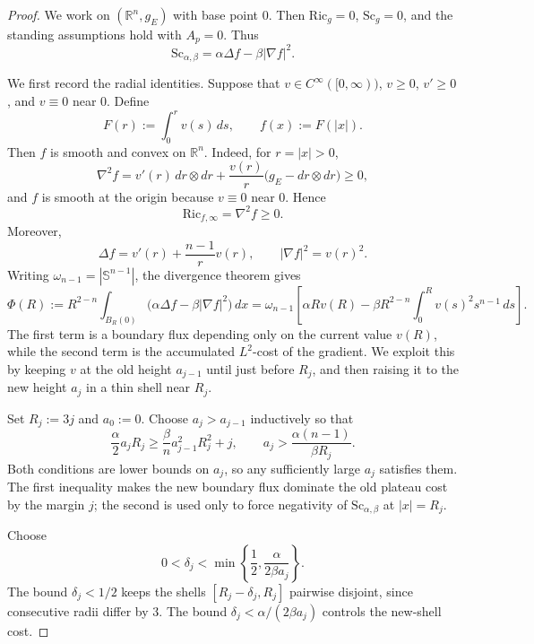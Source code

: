 \documentclass[10pt,a4paper]{amsart}
\begin{document}
\begin{proof}
We work on \((\mathbb R^n,g_{E})\) with base point \(0\). Then
\(\mathrm{Ric}_g=0\), \(\mathrm{Sc}_g=0\), and the standing assumptions hold
with \(A_p=0\). Thus
\[
  \mathrm{Sc}_{\alpha,\beta}
  =
  \alpha\Delta f-\beta|\nabla f|^2 .
\]

We first record the radial identities. Suppose that
\(v\in C^\infty([0,\infty))\), \(v\ge0\), \(v'\ge0\), and \(v\equiv0\) near
\(0\). Define
\[
  F(r):=\int_0^r v(s)\,ds,
  \qquad
  f(x):=F(|x|).
\]
Then \(f\) is smooth and convex on \(\mathbb R^n\). Indeed, for \(r=|x|>0\),
\[
  \nabla^2 f
  =
  v'(r)\,dr\otimes dr
  +
  \frac{v(r)}{r}
  \bigl(g_{E}-dr\otimes dr\bigr)\ge0,
\]
and \(f\) is smooth at the origin because \(v\equiv0\) near \(0\). Hence
\[
  \mathrm{Ric}_{f,\infty}
  =
  \nabla^2 f
  \ge0.
\]
Moreover,
\[
  \Delta f=v'(r)+\frac{n-1}{r}v(r),
  \qquad
  |\nabla f|^2=v(r)^2 .
\]
Writing \(\omega_{n-1}=|\mathbb S^{n-1}|\), the divergence theorem gives
\begin{equation}\label{eq:Phi-short-final}
  \Phi(R):=
  R^{2-n}
  \int_{B_R(0)}
  \bigl(\alpha\Delta f-\beta|\nabla f|^2\bigr)\,dx
  =
  \omega_{n-1}
  \left[
    \alpha Rv(R)
    -
    \beta R^{2-n}\int_0^R v(s)^2s^{n-1}\,ds
  \right].
\end{equation}
The first term is a boundary flux depending only on the current value
\(v(R)\), while the second term is the accumulated \(L^2\)-cost of the
gradient. We exploit this by keeping \(v\) at the old height \(a_{j-1}\) until
just before \(R_j\), and then raising it to the new height \(a_j\) in a thin
shell near \(R_j\).

Set \(R_j:=3j\) and \(a_0:=0\). Choose \(a_j>a_{j-1}\) inductively so that
\begin{equation}\label{eq:aj-final-short}
  \frac{\alpha}{2}a_jR_j
  \ge
  \frac{\beta}{n}a_{j-1}^2R_j^2+j,
  \qquad
  a_j>\frac{\alpha(n-1)}{\beta R_j}.
\end{equation}
Both conditions are lower bounds on \(a_j\), so any sufficiently large \(a_j\)
satisfies them. The first inequality makes the new boundary flux dominate the
old plateau cost by the margin \(j\); the second is used only to force
negativity of \(\mathrm{Sc}_{\alpha,\beta}\) at \(|x|=R_j\).

Choose
\[
  0<\delta_j<
  \min\left\{\frac12,\frac{\alpha}{2\beta a_j}\right\}.
\]
The bound \(\delta_j<1/2\) keeps the shells
\([R_j-\delta_j,R_j]\) pairwise disjoint, since consecutive radii differ by
\(3\). The bound \(\delta_j<\alpha/(2\beta a_j)\) controls the new-shell cost.


\end{proof}
\end{document}
